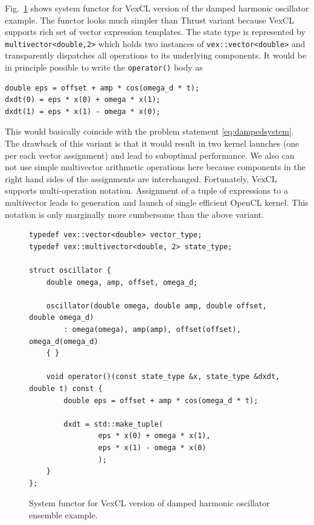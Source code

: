 \documentclass[1p]{elsarticle}
\newcommand{\code}[1]{\lstinline|#1|}
\newcommand{\figref}[1]{Fig.~\ref{#1}}
\begin{document}
\figref{code:vexcl:damped} shows system functor for VexCL version of the damped
harmonic oscillator example. The functor looks much simpler than Thrust variant
because VexCL supports rich set of vector expression templates. The
state type is represented by \code{multivector<double,2>} which holds two
instances of \code{vex::vector<double>} and transparently dispatches all
operations to its underlying components. It would be in principle possible to
write the \code{operator()} body as
\begin{lstlisting}[frame=leftline]
double eps = offset + amp * cos(omega_d * t);
dxdt(0) = eps * x(0) + omega * x(1);
dxdt(1) = eps * x(1) - omega * x(0);
\end{lstlisting}
This would basically coincide with the problem statement
\eqref{eq:dampedsystem}. The drawback of this variant is that it would result
in two kernel launches (one per each vector assignment) and lead to suboptimal
performance. We also can not use simple multivector arithmetic operations here
because components in the right hand sides of the assignments are interchanged.
Fortunately, VexCL supports multi-operation notation. Assignment of a tuple of
expressions to a multivector leads to generation and launch of single efficient
OpenCL kernel. This notation is only marginally more cumbersome than the above
variant.

\begin{figure}[p]
\begin{lstlisting}
typedef vex::vector<double> vector_type;
typedef vex::multivector<double, 2> state_type;

struct oscillator {
    double omega, amp, offset, omega_d;

    oscillator(double omega, double amp, double offset, double omega_d)
        : omega(omega), amp(amp), offset(offset), omega_d(omega_d)
    { }

    void operator()(const state_type &x, state_type &dxdt, double t) const {
        double eps = offset + amp * cos(omega_d * t);

        dxdt = std::make_tuple(
                eps * x(0) + omega * x(1),
                eps * x(1) - omega * x(0)
                );
    }
};
\end{lstlisting}
\caption{System functor for VexCL version of damped harmonic oscillator
ensemble example.}
\label{code:vexcl:damped}
\end{figure}
\end{document}
